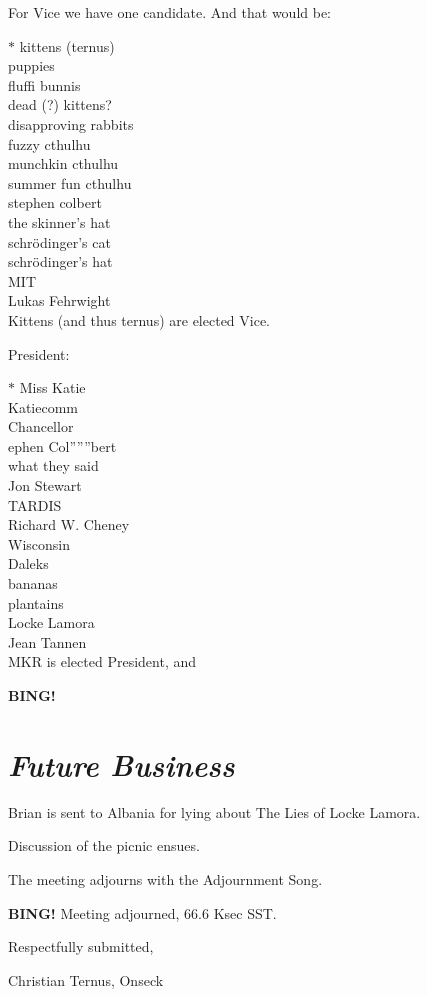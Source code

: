 \documentclass[10pt]{article}
\newcommand{\bing}{{\bf BING!} }
\newcommand{\goto}[1]{\bing \vskip 12pt \section*{{\em{#1}}}}
\begin{document}
For Vice we have one candidate.  And that would be:

$*$ kittens (ternus)\\
puppies\\
fluffi bunnis\\
dead (?) kittens?\\
disapproving rabbits\\
fuzzy cthulhu\\
munchkin cthulhu\\
summer fun cthulhu\\
stephen colbert\\
the skinner's hat\\
schr\"{o}dinger's cat\\
schr\"{o}dinger's hat\\
MIT\\
Lukas Fehrwight\\

Kittens (and thus ternus) are elected Vice.

President:

$*$ Miss Katie\\
Katiecomm\\
Chancellor\\
ephen Col''''''bert\\
what they said\\
Jon Stewart\\
TARDIS\\
Richard W. Cheney\\
Wisconsin\\
Daleks\\
bananas\\
plantains\\
Locke Lamora\\
Jean Tannen\\

MKR is elected President, and 

\goto{Future Business}

Brian is sent to Albania for lying about The Lies of Locke Lamora.

Discussion of the picnic ensues.

The meeting adjourns with the Adjournment Song.

\bing
\noindent
Meeting adjourned, 66.6 Ksec SST.

\vspace{18pt}

\centerline{Respectfully submitted,}
\centerline{Christian Ternus, Onseck}
\end{document}
